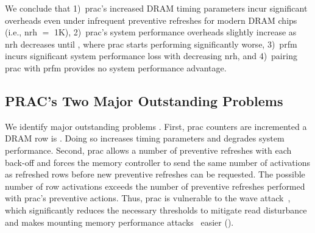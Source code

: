 We conclude that
1)~\gls{prac}'s increased DRAM timing parameters incur significant overheads even under infrequent preventive refreshes for modern DRAM chips (i.e., \gls{nrh} $=$ 1K),
2)~\gls{prac}'s system performance overheads slightly increase as \gls{nrh} decreases until , where \gls{prac} starts performing significantly worse,
3)~\gls{prfm} incurs significant system performance loss with decreasing \gls{nrh}, and
4)~pairing \gls{prac} with \gls{prfm} provides no system performance advantage.

\subsection{PRAC's Two Major Outstanding Problems}

We identify  major outstanding problems .
First, \gls{prac} counters are incremented  a DRAM row is .
Doing so increases  timing parameters and degrades system performance.
Second, \gls{prac} allows a  number of preventive refreshes with each back-off and forces the memory controller to send the same number of activations as refreshed rows before new preventive refreshes can be requested.
The possible number of row activations exceeds the number of preventive refreshes performed with \gls{prac}'s preventive actions.
Thus, \gls{prac} is vulnerable to the wave attack~\cite{yaglikci2021security, devaux2021method}, which significantly reduces the necessary thresholds to mitigate read disturbance and makes mounting memory performance attacks~\cite{mutlu2007stall} easier ().
